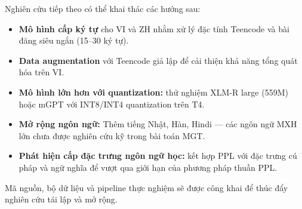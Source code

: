 Nghiên cứu tiếp theo có thể khai thác các hướng sau:

\begin{itemize}
    \item \textbf{Mô hình cấp ký tự} cho VI và ZH nhằm xử lý đặc tính
          Teencode và bài đăng siêu ngắn (15--30 ký tự).
    \item \textbf{Data augmentation} với Teencode giả lập để cải thiện
          khả năng tổng quát hóa trên VI.
    \item \textbf{Mô hình lớn hơn với quantization:} thử nghiệm XLM-R
          large (559M) hoặc mGPT với INT8/INT4 quantization trên T4.
    \item \textbf{Mở rộng ngôn ngữ:} Thêm tiếng Nhật, Hàn, Hindi ---
          các ngôn ngữ MXH lớn chưa được nghiên cứu kỹ trong bài toán MGT.
    \item \textbf{Phát hiện cấp đặc trưng ngôn ngữ học:} kết hợp PPL
          với đặc trưng cú pháp và ngữ nghĩa để vượt qua giới hạn của
          phương pháp thuần PPL.
\end{itemize}

Mã nguồn, bộ dữ liệu và pipeline thực nghiệm sẽ được công khai để
thúc đẩy nghiên cứu tái lập và mở rộng.
